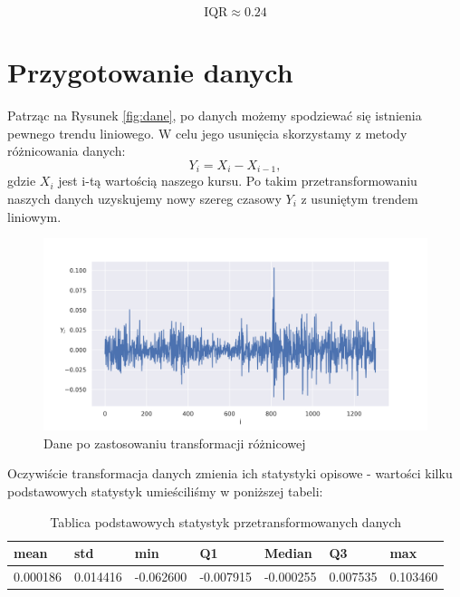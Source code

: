 \documentclass[fleqn]{article}
\theoremstyle{plain}
\begin{document}
    $$\text{IQR} \approx 0.24$$

    \section{Przygotowanie danych}
        Patrząc na Rysunek \ref{fig:dane}, po danych możemy spodziewać się istnienia pewnego trendu liniowego.
        W celu jego usunięcia skorzystamy z metody różnicowania danych:
        $$
                Y_i = X_i - X_{i-1},
        $$
        gdzie $X_i$ jest i-tą wartością naszego kursu.
        Po takim przetransformowaniu naszych danych uzyskujemy nowy szereg czasowy $Y_i$ z usuniętym trendem liniowym.

    \begin{figure}[H]
        \centering
        \includegraphics[width=1\textwidth]{trend.png}
        \caption{Dane po zastosowaniu transformacji różnicowej}
        \label{fig:2 Transformacja roznicowa}
    \end{figure}

    \vskip 0.2in
    Oczywiście transformacja danych zmienia ich statystyki opisowe - wartości kilku podstawowych statystyk umieściliśmy w poniższej tabeli:

    \begin{table}[H]
        \centering
        \begin{tabular}{|l|l|l|l|l|l|l|}
        \hline
        mean     & std      & min       & Q1        & Median    & Q3       & max      \\ \hline
        0.000186 & 0.014416 & -0.062600 & -0.007915 & -0.000255 & 0.007535 & 0.103460 \\ \hline
        \end{tabular}
        \caption{Tablica  podstawowych statystyk przetransformowanych danych}
        \label{tab:transform_besic_stats}
    \end{table}
\end{document}
